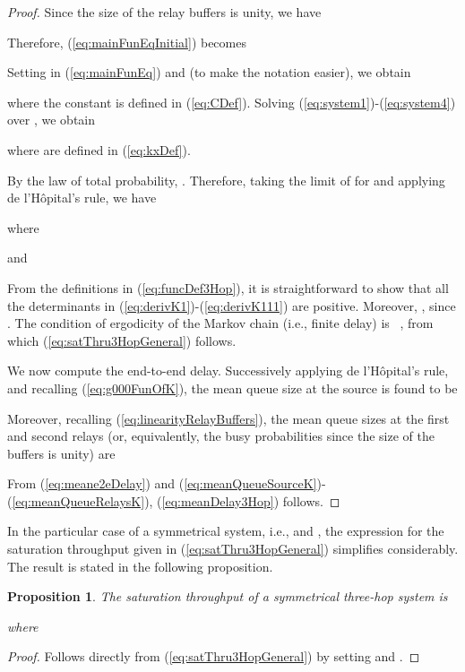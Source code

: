 \documentclass[draftclsnofoot,10pt,onecolumn,letterpaper]{IEEEtran}
\newtheorem{propos}{Proposition}
\begin{document}
\begin{proof}
Since the size of the relay buffers is unity, we have

Therefore, (\ref{eq:mainFunEqInitial}) becomes

Setting  in (\ref{eq:mainFunEq}) and  (to make the notation easier), we obtain

where the constant  is defined in (\ref{eq:CDef}). Solving (\ref{eq:system1})-(\ref{eq:system4}) over , we obtain

where  are defined in (\ref{eq:kxDef}).

By the law of total probability, . Therefore, taking the limit of  for  and
applying de l'H\^{o}pital's rule, we have 

where

and

From the definitions in (\ref{eq:funcDef3Hop}), it is straightforward to show that all the determinants in (\ref{eq:derivK1})-(\ref{eq:derivK111}) are positive.
Moreover, , since .
The condition of ergodicity of the Markov chain (i.e., finite delay) is ~\cite{Sidi87}, from which (\ref{eq:satThru3HopGeneral}) follows.

We now compute the end-to-end delay. Successively applying de l'H\^{o}pital's rule, and recalling (\ref{eq:g000FunOfK}),
the mean queue size at the source is found to be

Moreover, recalling (\ref{eq:linearityRelayBuffers}), the mean queue sizes at the first and second relays (or, equivalently, the busy probabilities since
the size of the buffers is unity) are

From (\ref{eq:meane2eDelay}) and (\ref{eq:meanQueueSourceK})-(\ref{eq:meanQueueRelaysK}), (\ref{eq:meanDelay3Hop}) follows.
\end{proof}

In the particular case of a symmetrical system, i.e.,  and , the expression for the saturation throughput
given in (\ref{eq:satThru3HopGeneral}) simplifies considerably. The result is stated in the following proposition.

\begin{propos}
\label{prop:thru3HopSym}
The saturation throughput of a symmetrical three-hop system is 

where

\end{propos}
\begin{proof}
Follows directly from (\ref{eq:satThru3HopGeneral}) by setting   and .
\end{proof}
\end{document}
